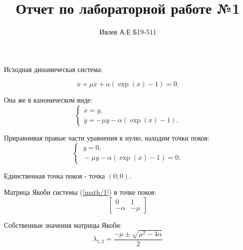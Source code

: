 \documentclass[10pt,a4paper]{article}
\title{Отчет по лабораторной работе №1}
\author{Ивлев А.Е Б19-511}
\begin{document}
	\maketitle
	
	Исходная динамическая система:
	
	\begin{equation}
		\label{math/1}
		\ddot{x} + \mu \dot{x} + \alpha (\exp(x) - 1) = 0.	
	\end{equation}
	
	Она же в каноническом виде:
	\begin{equation}
		\label{math/2}
		\begin{cases}
			\dot{x} = y, \\
			\dot{y} = -\mu y - \alpha (\exp(x) - 1).
		\end{cases}
	\end{equation}

	Приравнивая правые части уравнения к нулю, находим точки покоя:
	\begin{equation}
		\label{math/3}
		\begin{cases}
			\ y = 0, \\
			\ -\mu y - \alpha (\exp(x) - 1) = 0.
		\end{cases}
	\end{equation}
	
	Единственная точка покоя - точка $(0;0)$.
	
	Матрица Якоби системы (\ref{math/1}) в точке покоя:
	\begin{equation}
		\label{math/4}
		\begin{bmatrix}
			0& 1\\
			-\alpha& -\mu
		\end{bmatrix}
	\end{equation}
	
	Собственные значения матрицы Якоби:
	\begin{equation}
		\label{math/5}
		\lambda_{1,2} = \frac{-\mu \pm \sqrt{\mu^{2} - 4\alpha}}{2}
	\end{equation}
	
	
\end{document}
